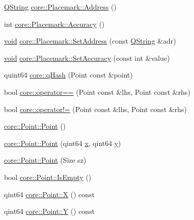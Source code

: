 \begin{DoxyCompactItemize}
\item 
\hyperlink{group___u_a_v_objects_plugin_gab9d252f49c333c94a72f97ce3105a32d}{\-Q\-String} \hyperlink{group___o_p_map_widget_ga6954c8bd25b9e37d34b49c03a88a33db}{core\-::\-Placemark\-::\-Address} ()
\item 
int \hyperlink{group___o_p_map_widget_ga35e7221f35ac45cd6b658ec7aaefe9f0}{core\-::\-Placemark\-::\-Accuracy} ()
\item 
\hyperlink{group___u_a_v_objects_plugin_ga444cf2ff3f0ecbe028adce838d373f5c}{void} \hyperlink{group___o_p_map_widget_gab54288ead0f6c2ce83424449ae9c0fe9}{core\-::\-Placemark\-::\-Set\-Address} (const \hyperlink{group___u_a_v_objects_plugin_gab9d252f49c333c94a72f97ce3105a32d}{\-Q\-String} \&adr)
\item 
\hyperlink{group___u_a_v_objects_plugin_ga444cf2ff3f0ecbe028adce838d373f5c}{void} \hyperlink{group___o_p_map_widget_gaf3816263edb9fd676defbb9332a69624}{core\-::\-Placemark\-::\-Set\-Accuracy} (const int \&value)
\item 
quint64 \hyperlink{group___o_p_map_widget_ga684da93d6a34494be39f2a374429e7e7}{core\-::q\-Hash} (\-Point const \&point)
\item 
bool \hyperlink{group___o_p_map_widget_ga652c57ec321fe6e8b42404776fb48e49}{core\-::operator==} (\-Point const \&lhs, \-Point const \&rhs)
\item 
bool \hyperlink{group___o_p_map_widget_ga9fd3fb077a6e407e4c5a477a8c6d73a0}{core\-::operator!=} (\-Point const \&lhs, \-Point const \&rhs)
\item 
\hyperlink{group___o_p_map_widget_ga674c2f3c2d11aa89d2c51dc42bdeb88e}{core\-::\-Point\-::\-Point} ()
\item 
\hyperlink{group___o_p_map_widget_gad1dcff6c9f2c25281ea28be5eb36e2b1}{core\-::\-Point\-::\-Point} (qint64 \hyperlink{_o_p_plots_8m_a9336ebf25087d91c818ee6e9ec29f8c1}{x}, qint64 \hyperlink{_o_p_plots_8m_a2fb1c5cf58867b5bbc9a1b145a86f3a0}{y})
\item 
\hyperlink{group___o_p_map_widget_gad3510c0e0b0ac201ddaced67030e7cdc}{core\-::\-Point\-::\-Point} (\-Size sz)
\item 
bool \hyperlink{group___o_p_map_widget_ga82d2ada8c2a4cff27b8d1cd67e5b8677}{core\-::\-Point\-::\-Is\-Empty} ()
\item 
qint64 \hyperlink{group___o_p_map_widget_gaa80c6ca1d28f90037f40c53e2093cde2}{core\-::\-Point\-::\-X} () const 
\item 
qint64 \hyperlink{group___o_p_map_widget_ga15325baf78dea74cc34b00887dd5539b}{core\-::\-Point\-::\-Y} () const 

\end{DoxyCompactItemize}

